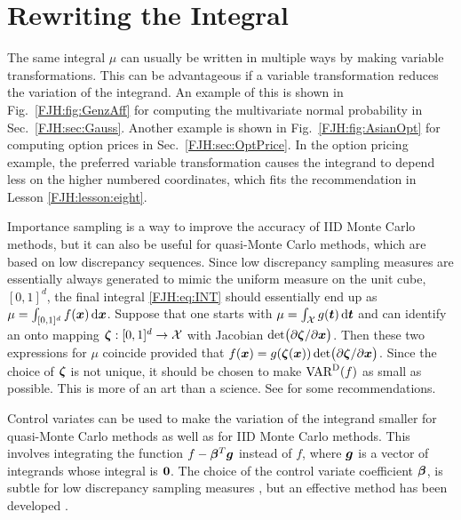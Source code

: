 \documentclass[graybox,footinfo]{svmult}
\begin{document}
\begin{FJHLesson} \label{FJH:lesson:eight}
	\FJHLessonEight
\end{FJHLesson}

\section{Rewriting the Integral}

The same integral $\mu$ can usually be written in multiple ways by making variable 
transformations.  This can be advantageous if a variable transformation reduces the 
variation of the integrand.  An example of this is shown in Fig.\ \ref{FJH:fig:GenzAff} for 
computing the multivariate normal probability in Sec.\ \ref{FJH:sec:Gauss}.  Another 
example is shown in Fig.\ \ref{FJH:fig:AsianOpt} for computing option prices  in Sec.\ 
\ref{FJH:sec:OptPrice}.  In the option pricing example, the preferred variable 
transformation causes 
the integrand to depend less on the higher numbered coordinates, which fits the 
recommendation in  Lesson \ref{FJH:lesson:eight}.

Importance sampling is a way to improve the accuracy of IID Monte Carlo 
methods, but it can also be useful for quasi-Monte Carlo methods, which are based on 
low discrepancy sequences.  Since low discrepancy sampling measures are essentially 
always generated to mimic the uniform measure on the unit cube, $[0,1]^d$, the final 
integral \eqref{FJH:eq:INT} should essentially end up as $\mu = \int_{[0,1]^{d}} f({\boldsymbol{x}}) \, 
\mathrm{d}{\boldsymbol{x}}$.  Suppose that one starts with $\mu = \int_{{\mathcal{X}}} g({\boldsymbol{t}}) \, 
\mathrm{d}{\boldsymbol{t}}$ and can identify an onto mapping ${\boldsymbol{\zeta}}: [0,1]^d \to {\mathcal{X}}$ with
Jacobian $\det\bigl( \partial {\boldsymbol{\zeta}}/\partial {\boldsymbol{x}}\bigr)$.  Then these two expressions for 
$\mu$ coincide provided that $f({\boldsymbol{x}}) = g({\boldsymbol{\zeta}}({\boldsymbol{x}})) \det\bigl( \partial 
{\boldsymbol{\zeta}}/\partial {\boldsymbol{x}}\bigr)$.  Since the choice of ${\boldsymbol{\zeta}}$ is not unique, it should be 
chosen to make $\textup{VAR}^{\textup{D}}(f)$ as small as possible.  This is more of an art than a 
science.  See \cite[Chap.\ 9]{Owe13a} for some recommendations.

Control variates can be used to make the variation of the integrand smaller for 
quasi-Monte Carlo methods as well as for IID Monte Carlo methods.  This involves 
integrating the function $f - {\boldsymbol{\beta}}^T {\boldsymbol{g}}$ instead of $f$, where ${\boldsymbol{g}}$ is a vector of 
integrands whose integral is ${\boldsymbol{0}}$.  The choice of the 
control variate coefficient ${\boldsymbol{\beta}}$, is subtle for low discrepancy sampling measures 
\cite{HicEtal03}, but an effective method has been 
developed \cite{HicEtal17a}.
\end{document}
